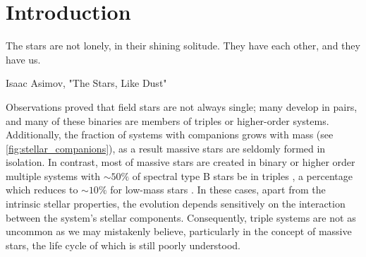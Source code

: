 \chapter{Introduction}

\epigraph{The stars are not lonely, in their shining solitude. They have each other, and they have us.}{Isaac Asimov, "The Stars, Like Dust"}


Observations proved that field stars are not always single; many develop in pairs, and many of these binaries are members of triples or higher-order systems. Additionally, the fraction of systems with companions grows with mass (see \cref{fig:stellar_companions}), as a result massive stars are seldomly formed in isolation. In contrast, most of massive stars are created in binary or higher order multiple systems with $\sim 50\%$ of spectral type B stars be in triples \citep{sana2014southern,moe2017mind}, a percentage which reduces to $\sim 10\%$ for low-mass stars \citep{raghavan2010survey,toonen2014popcorn,moe2017mind}. In these cases, apart from the intrinsic stellar properties, the evolution depends sensitively on the interaction between the system's stellar components. Consequently, triple systems are not as uncommon as we may mistakenly believe, particularly in the concept of massive stars, the life cycle of which is still poorly understood.

